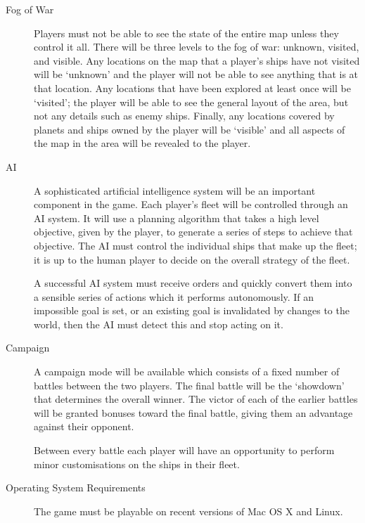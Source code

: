 \begin{description}

	\item[Fog of War]

	Players must not be able to see the state of the entire map unless they control it all. There
	will be three levels to the fog of war: unknown, visited, and visible. Any locations on the map
	that a player's ships have not visited will be `unknown' and the player will not be able to see
	anything that is at that location. Any locations that have been explored at least once will be
	`visited'; the player will be able to see the general layout of the area, but not any details
	such as enemy ships. Finally, any locations covered by planets and ships owned by the player will
	be `visible' and all aspects of the map in the area will be revealed to the player.

	\item[AI]

	A sophisticated artificial intelligence system will be an important component in the game.
	Each player's fleet will be controlled through an AI system. It will use a planning algorithm
	that takes a high level objective, given by the player, to generate a series of steps to
	achieve that objective. The AI must control the individual ships that make up the fleet; it
	is up to the human player to decide on the overall strategy of the fleet.

	A successful AI system must receive orders and quickly convert them into a sensible series of
	actions which it performs autonomously. If an impossible goal is set, or an existing goal is
	invalidated by changes to the world, then the AI must detect this and stop acting on it.


	\item[Campaign]

	A campaign mode will be available which consists of a fixed number of battles between the two players.
	The final battle will be the `showdown' that determines the overall winner. The victor of each of
	the earlier battles will be granted bonuses toward the final battle, giving them an advantage against
	their opponent.

	Between every battle each player will have an opportunity to perform minor customisations on
	the ships in their fleet.

	\item[Operating System Requirements]

	The game must be playable on recent versions of Mac OS X and Linux.


\end{description}

